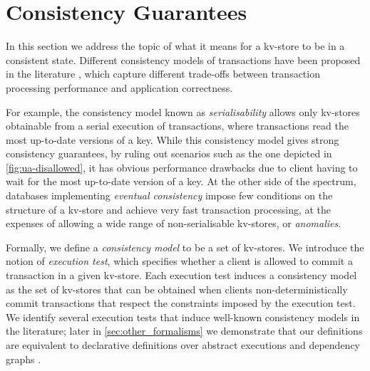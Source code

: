 \section{Consistency Guarantees}
\label{sec:cm}
In this section we address the topic of what it means for a kv-store 
to be in a consistent state. Different consistency models of transactions have 
been proposed in the literature \cite{ev_principles,rola,cops,redblue,PSI,clocksi}, which capture different trade-offs 
between transaction processing performance and application correctness. 

For example, the consistency model known as \emph{serialisability} allows only kv-stores 
obtainable from a serial execution of transactions, where transactions read the most up-to-date 
versions of a key. While this consistency model gives strong consistency guarantees, by ruling out scenarios 
such as the one depicted in \cref{fig:ua-disallowed}, it has obvious performance drawbacks due to client 
having to wait for the most up-to-date version of a key. At the other side of the spectrum, databases 
implementing \emph{eventual consistency} impose few conditions on the structure of a kv-store 
and achieve very fast transaction processing, at the expenses 
of allowing a wide range of non-serialisable kv-stores, or \emph{anomalies}.

Formally, we define a \emph{consistency model} to be a set of kv-stores. We introduce the notion of 
\emph{execution test}, which specifies whether a client is allowed to commit a transaction in a given 
kv-store. Each execution test induces a consistency model as the set of kv-stores that 
can be obtained when clients non-deterministically commit transactions that respect the constraints 
imposed by the execution test. We identify several execution tests that induce well-known consistency 
models in the literature; later in \cref{sec:other_formalisms} we demonstrate that our definitions are equivalent 
to declarative definitions over abstract executions \cite{framework-concur} and dependency graphs \cite{adya}.





